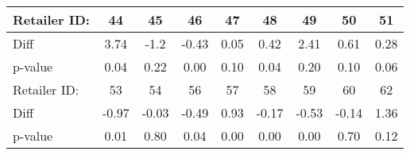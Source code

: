 \begin{tabular}{l c c c c c c c c} \hline
Retailer ID: & 44 & 45 & 46 & 47 & 48 & 49 & 50 & 51 \\ \hline
Diff  & 3.74 & -1.2 & -0.43 & 0.05 & 0.42 & 2.41 & 0.61 & 0.28 \\
p-value  & 0.04 & 0.22 & 0.00 & 0.10 & 0.04 & 0.20 & 0.10 & 0.06\\ \hline
Retailer ID: & 53 & 54 & 56 & 57 & 58 & 59 & 60 & 62 \\ \hline
Diff  & -0.97 & -0.03 & -0.49 & 0.93 & -0.17 & -0.53 & -0.14 & 1.36 \\
p-value  & 0.01 & 0.80 & 0.04 & 0.00 & 0.00 & 0.00 & 0.70 & 0.12 \\ \hline
\end{tabular}